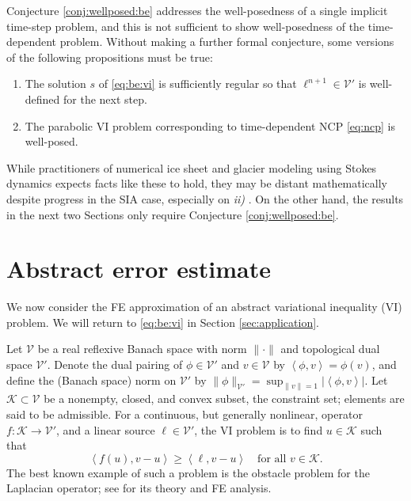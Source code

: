 \documentclass[hidelinks,onefignum,onetabnum,final]{siamart220329}  %
\newcommand{\cK}{\mathcal{K}}
\newcommand{\cV}{\mathcal{V}}
\newcommand{\ip}[2]{\left<#1,#2\right>}
\begin{document}
Conjecture \ref{conj:wellposed:be} addresses the well-posedness of a single implicit time-step problem, and this is not sufficient to show well-posedness of the time-dependent problem.  Without making a further formal conjecture, some versions of the following propositions must be true:
\renewcommand{\labelenumi}{\emph{\roman{enumi})}}
\begin{enumerate}
\item The solution $s$ of \eqref{eq:be:vi} is sufficiently regular so that $\ell^{n+1} \in \cV'$ is well-defined for the next step.
\item The parabolic VI problem \cite{Glowinski1984} corresponding to time-dependent NCP \eqref{eq:ncp} is well-posed.
\end{enumerate}
While practitioners of numerical ice sheet and glacier modeling using Stokes dynamics expects facts like these to hold, they may be distant mathematically despite progress in the SIA case, especially on \emph{ii)} \cite{Calvoetal2003,PiersantiTemam2023}.  On the other hand, the results in the next two Sections only require Conjecture \ref{conj:wellposed:be}.


\section{Abstract error estimate} \label{sec:abstractestimate}

We now consider the FE approximation of an abstract variational inequality (VI) problem.  We will return to \eqref{eq:be:vi} in Section \ref{sec:application}.

Let $\cV$ be a real reflexive Banach space with norm $\|\cdot\|$ and topological dual space $\cV'$.  Denote the dual pairing of $\phi \in \cV'$ and $v\in\cV$ by $\ip{\phi}{v} = \phi(v)$, and define the (Banach space) norm on $\cV'$ by $\|\phi\|_{\cV'} = \sup_{\|v\|=1} |\!\ip{\phi}{v}\!|$.  Let $\cK \subset \cV$ be a nonempty, closed, and convex subset, the constraint set; elements are said to be admissible.  For a continuous, but generally nonlinear, operator $f:\cK \to \cV'$, and a linear source $\ell\in \cV'$, the VI problem is to find $u\in \cK$ such that
\begin{equation}
\ip{f(u)}{v-u} \ge \ip{\ell}{v-u} \quad \text{for all } v\in \cK. \label{eq:vi}
\end{equation}
The best known example of such a problem is the obstacle problem for the Laplacian operator; see \cite{Ciarlet2002,Evans2010,KinderlehrerStampacchia1980} for its theory and FE analysis.
\end{document}

